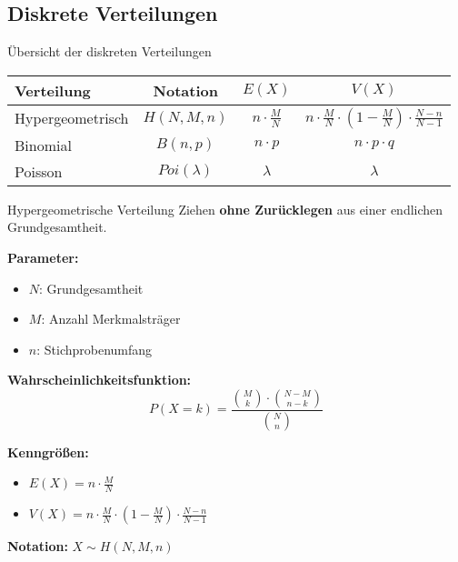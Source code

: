 \subsection{Diskrete Verteilungen}

\begin{concept}{Übersicht der diskreten Verteilungen}
\begin{center}
\begin{tabular}{|l|c|c|c|}
\hline
Verteilung & Notation & $E(X)$ & $V(X)$ \\ \hline
Hypergeometrisch & $H(N,M,n)$ & $n \cdot \frac{M}{N}$ & $n \cdot \frac{M}{N} \cdot (1-\frac{M}{N}) \cdot \frac{N-n}{N-1}$ \\ \hline
Binomial & $B(n,p)$ & $n \cdot p$ & $n \cdot p \cdot q$ \\ \hline
Poisson & $Poi(\lambda)$ & $\lambda$ & $\lambda$ \\ \hline
\end{tabular}
\end{center}
\end{concept}

\begin{definition}{Hypergeometrische Verteilung}
Ziehen \textbf{ohne Zurücklegen} aus einer endlichen Grundgesamtheit.

\textbf{Parameter:}
\begin{itemize}
    \item $N$: Grundgesamtheit
    \item $M$: Anzahl Merkmalsträger
    \item $n$: Stichprobenumfang
\end{itemize}

\textbf{Wahrscheinlichkeitsfunktion:}
$$P(X=k) = \frac{\binom{M}{k} \cdot \binom{N-M}{n-k}}{\binom{N}{n}}$$

\textbf{Kenngrößen:}
\begin{itemize}
    \item $E(X) = n \cdot \frac{M}{N}$
    \item $V(X) = n \cdot \frac{M}{N} \cdot (1-\frac{M}{N}) \cdot \frac{N-n}{N-1}$
\end{itemize}

\textbf{Notation:} $X \sim H(N,M,n)$
\end{definition}

